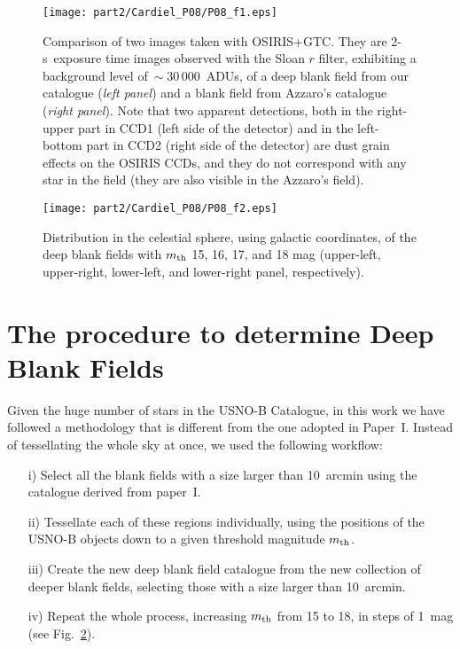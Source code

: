 \begin{figure}
\centerline{%
\texttt{[image: part2/Cardiel\_P08/P08\_f1.eps]}}
\caption{Comparison of two images taken with OSIRIS+GTC. They are \mbox{2-s
exposure} time images observed with the Sloan $r$ filter, exhibiting a
background level of$~\sim 30\,000$~ADUs, of a deep blank field from our
catalogue (\emph{left panel}) and a blank field from Azzaro's catalogue
(\emph{right panel}). Note that two apparent detections, both in the
right-upper part in CCD1 (left side of the detector) and in the left-bottom
part in CCD2 (right side of the detector) are dust grain effects on the OSIRIS
CCDs, and they do not correspond with any star in the field (they are also
visible in the Azzaro's field).}
\label{example_DBF}
\end{figure}

\begin{figure}
\centerline{%
\texttt{[image: part2/Cardiel\_P08/P08\_f2.eps]}}
\caption{Distribution in the celestial sphere, using galactic coordinates, of
the deep blank fields with $m_{\mbox{\scriptsize th}}$ 15, 16, 17, and 18 mag 
(upper-left, upper-right, lower-left, and lower-right panel, respectively).}
\label{result_DBF}
\end{figure}


\section{The procedure to determine Deep Blank Fields}

Given the huge number of stars in the USNO-B Catalogue, in this work we have
followed a methodology that is different from the one adopted in Paper~I.
Instead of tessellating the whole sky at once, we
used the following workflow:
\begin{itemize}
  \item[i)] Select all the blank fields with a size larger than 10~arcmin using
  the catalogue derived from paper~I.
  \item[ii)] Tessellate each of these regions individually, using the positions
  of the USNO-B objects down to a given threshold magnitude
  $m_{\mbox{\scriptsize th}}$.
  \item[iii)] Create the new deep blank field catalogue from the new collection
  of deeper blank fields, selecting those with a size larger than 10~arcmin.
  \item[iv)] Repeat the whole process, increasing 
  $m_{\mbox{\scriptsize th}}$ from 15 to 18, in steps of 1~mag (see
  Fig.~\ref{result_DBF}).
\end{itemize}


